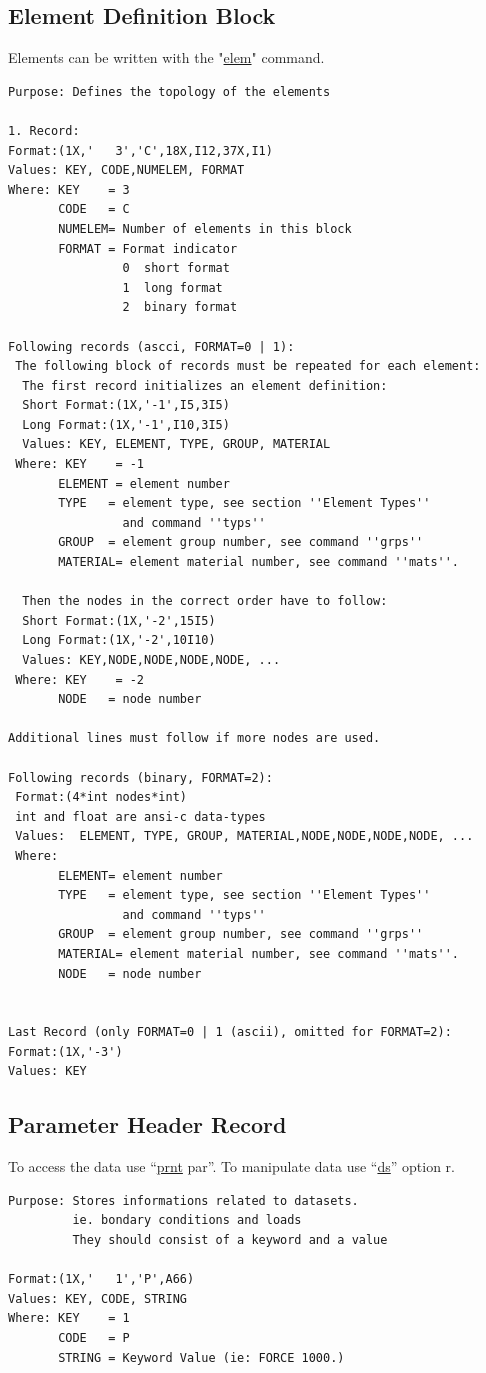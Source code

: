 \documentclass{article}
\providecommand{\htmlref}[2]{\hyperref[#2]{#1}}
\begin{document}
\subsection{\label{Element Definition Block}Element Definition Block}
Elements can be written with the "\htmlref{elem}{elem}" command.
\begin{verbatim}
Purpose: Defines the topology of the elements

1. Record:
Format:(1X,'   3','C',18X,I12,37X,I1)
Values: KEY, CODE,NUMELEM, FORMAT
Where: KEY    = 3
       CODE   = C
       NUMELEM= Number of elements in this block
       FORMAT = Format indicator
                0  short format
                1  long format 
                2  binary format 

Following records (ascci, FORMAT=0 | 1):
 The following block of records must be repeated for each element:
  The first record initializes an element definition:
  Short Format:(1X,'-1',I5,3I5)
  Long Format:(1X,'-1',I10,3I5)
  Values: KEY, ELEMENT, TYPE, GROUP, MATERIAL
 Where: KEY    = -1
       ELEMENT = element number
       TYPE   = element type, see section ''Element Types''
                and command ''typs''
       GROUP  = element group number, see command ''grps''
       MATERIAL= element material number, see command ''mats''.

  Then the nodes in the correct order have to follow:
  Short Format:(1X,'-2',15I5)
  Long Format:(1X,'-2',10I10)
  Values: KEY,NODE,NODE,NODE,NODE, ...
 Where: KEY    = -2
       NODE   = node number

Additional lines must follow if more nodes are used.

Following records (binary, FORMAT=2):
 Format:(4*int nodes*int)
 int and float are ansi-c data-types
 Values:  ELEMENT, TYPE, GROUP, MATERIAL,NODE,NODE,NODE,NODE, ...
 Where:
       ELEMENT= element number
       TYPE   = element type, see section ''Element Types''
                and command ''typs''
       GROUP  = element group number, see command ''grps''
       MATERIAL= element material number, see command ''mats''.
       NODE   = node number
  
  
Last Record (only FORMAT=0 | 1 (ascii), omitted for FORMAT=2):
Format:(1X,'-3')
Values: KEY
\end{verbatim}

\subsection{\label{Parameter Header Record}Parameter Header Record}
To access the data use ``\htmlref{prnt}{prnt} par''.
To manipulate data use ``\htmlref{ds}{ds}'' option r.
\begin{verbatim}
Purpose: Stores informations related to datasets.
         ie. bondary conditions and loads
         They should consist of a keyword and a value

Format:(1X,'   1','P',A66)  
Values: KEY, CODE, STRING
Where: KEY    = 1
       CODE   = P
       STRING = Keyword Value (ie: FORCE 1000.)

\end{verbatim}
\end{document}
